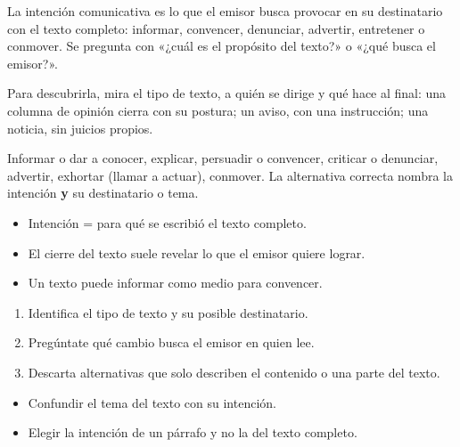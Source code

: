 \documentclass[10pt,a4paper,twocolumn]{article}
\begin{document}
La intención comunicativa es lo que el emisor busca provocar en su destinatario con el texto completo: informar, convencer, denunciar, advertir, entretener o conmover. Se pregunta con «¿cuál es el propósito del texto?» o «¿qué busca el emisor?».

Para descubrirla, mira el tipo de texto, a quién se dirige y qué hace al final: una columna de opinión cierra con su postura; un aviso, con una instrucción; una noticia, sin juicios propios.

\begin{definicion}
Informar o dar a conocer, explicar, persuadir o convencer, criticar o denunciar, advertir, exhortar (llamar a actuar), conmover. La alternativa correcta nombra la intención \textbf{y} su destinatario o tema.
\end{definicion}

\begin{ideasclave}
\begin{itemize}
  \item Intención = para qué se escribió el texto completo.
  \item El cierre del texto suele revelar lo que el emisor quiere lograr.
  \item Un texto puede informar como medio para convencer.
\end{itemize}
\end{ideasclave}

\begin{metodo}
\begin{enumerate}
  \item Identifica el tipo de texto y su posible destinatario.
  \item Pregúntate qué cambio busca el emisor en quien lee.
  \item Descarta alternativas que solo describen el contenido o una parte del texto.
\end{enumerate}
\end{metodo}

\begin{errorfrecuente}
\begin{itemize}
  \item Confundir el tema del texto con su intención.
  \item Elegir la intención de un párrafo y no la del texto completo.
\end{itemize}
\end{errorfrecuente}
\end{document}
